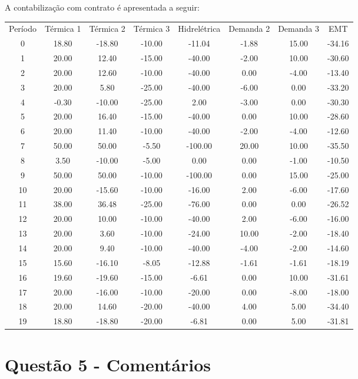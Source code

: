 \documentclass[a4paper,12pt,twoside]{article}
\begin{document}
A contabilização com contrato é apresentada a seguir:
\begin{center}
    \begin{tabular}{ c c c c c c c c }
        Período & Térmica 1  & Térmica 2  & Térmica 3  & Hidrelétrica  & Demanda 2  & Demanda 3 & EMT \\
        0    & 18.80   & -18.80   & -10.00  & -11.04   & -1.88   & 15.00 & -34.16 \\
        1    & 20.00    & 12.40   & -15.00  & -40.00   & -2.00   & 10.00 & -30.60 \\
        2    & 20.00    & 12.60   & -10.00  & -40.00    & 0.00   & -4.00 & -13.40 \\
        3    & 20.00     & 5.80   & -25.00  & -40.00   & -6.00    & 0.00 & -33.20 \\
        4    & -0.30   & -10.00   & -25.00    & 2.00   & -3.00    & 0.00 & -30.30 \\
        5    & 20.00    & 16.40   & -15.00  & -40.00    & 0.00   & 10.00 & -28.60 \\
        6    & 20.00    & 11.40   & -10.00  & -40.00   & -2.00   & -4.00 & -12.60 \\
        7    & 50.00    & 50.00    & -5.50 & -100.00   & 20.00   & 10.00 & -35.50 \\
        8     & 3.50   & -10.00    & -5.00    & 0.00    & 0.00   & -1.00 & -10.50 \\
        9    & 50.00    & 50.00   & -10.00 & -100.00    & 0.00   & 15.00 & -25.00 \\
        10   & 20.00   & -15.60   & -10.00  & -16.00    & 2.00   & -6.00 & -17.60 \\
        11   & 38.00    & 36.48   & -25.00  & -76.00    & 0.00    & 0.00 & -26.52 \\
        12   & 20.00    & 10.00   & -10.00  & -40.00    & 2.00   & -6.00 & -16.00 \\
        13   & 20.00     & 3.60   & -10.00  & -24.00   & 10.00   & -2.00 & -18.40 \\
        14   & 20.00     & 9.40   & -10.00  & -40.00   & -4.00   & -2.00 & -14.60 \\
        15   & 15.60   & -16.10    & -8.05  & -12.88   & -1.61   & -1.61 & -18.19 \\
        16   & 19.60   & -19.60   & -15.00   & -6.61    & 0.00   & 10.00 & -31.61 \\
        17   & 20.00   & -16.00   & -10.00  & -20.00    & 0.00   & -8.00 & -18.00 \\
        18   & 20.00    & 14.60   & -20.00  & -40.00    & 4.00    & 5.00 & -34.40 \\
        19   & 18.80   & -18.80   & -20.00   & -6.81    & 0.00    & 5.00 & -31.81
    \end{tabular}
\end{center}

\section{Questão 5 - Comentários}
\end{document}
